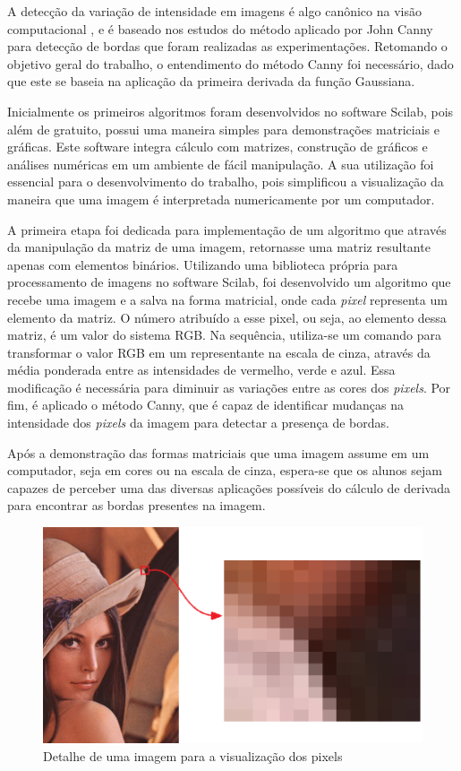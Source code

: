 \documentclass[12pt]{article}
\begin{document}
	A detecção da variação de intensidade em imagens é algo canônico na visão computacional \citep{canny1986computational}, e é baseado nos estudos do método aplicado por John Canny para detecção de bordas que foram realizadas as experimentações. Retomando o objetivo geral do trabalho, o entendimento do método Canny foi necessário, dado que este se baseia na aplicação da primeira derivada da função Gaussiana.
	
	Inicialmente os primeiros algoritmos foram desenvolvidos no software Scilab, pois além de gratuito, possui uma maneira simples para demonstrações matriciais e gráficas. Este software integra cálculo com matrizes, construção de gráficos e análises numéricas em um ambiente de fácil manipulação. A sua utilização foi essencial para o desenvolvimento do trabalho, pois simplificou a visualização da maneira que uma imagem é interpretada numericamente por um computador.
	
	A primeira etapa foi dedicada para implementação de um algoritmo que através da manipulação da matriz de uma imagem, retornasse uma matriz resultante apenas com elementos binários. Utilizando uma biblioteca própria para processamento de imagens no software Scilab, foi desenvolvido um algoritmo que recebe uma imagem e a salva na forma matricial, onde cada \textit{pixel} representa um elemento da matriz. O número atribuído a esse pixel, ou seja, ao elemento dessa matriz, é um valor do sistema RGB. Na sequência, utiliza-se um comando para transformar o valor RGB em um representante na escala de cinza, através da média ponderada entre as intensidades de vermelho, verde e azul. Essa modificação é necessária para diminuir as variações entre as cores dos \textit{pixels}. Por fim, é aplicado o método Canny, que é capaz de identificar mudanças na intensidade dos \textit{pixels} da imagem para detectar a presença de bordas.
	
	Após a demonstração das formas matriciais que uma imagem assume em um computador, seja em cores ou na escala de cinza, espera-se que os alunos sejam capazes de perceber uma das diversas aplicações possíveis do cálculo de derivada para encontrar as bordas presentes na imagem.
	
	\begin{figure}[h!]
		\centering
		\includegraphics[width=0.5\linewidth]{img/F1}
		\caption{Detalhe de uma imagem para a visualização dos pixels}
		\label{fig:f1}
	\end{figure}
	 
\end{document}
